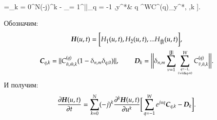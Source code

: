 \begin{urv}{60}
	 =\sum_{k = 0}^{N}(-j)^k\bigg[
	\sum_{q = -1}^{W} e^{juq} \sum_{\nu = 1, \atop \tilde{\nu}\neq y^*\& q\neq 0}^{|\mathbb{J}|} 
	 C^{(q)}_{\tilde{\nu}, y^*,k}\pdv[k]{H_{\tilde{\nu}}(u,t)}{u}
	-
	\sum_{\nu = 1}^{||}\sum_{q = -1 ,\atop \tilde{\nu}\neq y^*\& q }^{W}C^{(q)}_{y^*, \tilde{\nu},k}
	\bigg].\\
\end{urv}	
Обозначим:
\begin{gather*}
	\boldsymbol{H}(u,t) = \bigg[H_{\tilde{1}}(u,t), H_{\tilde{2}}(u,t), ... H_{\tilde{|\mathbb{J}|} }(u,t)\bigg] ,\\
	\boldsymbol{C}_{q,k} = ||C^{(q)}_{\tilde{n},\tilde{m}, k}(1-\delta_{n,m}\delta_{q,0})||,
	\text{ }\text{ }\text{ }\text{ }\text{ }\text{ }\text{ }\text{ }\text{ }\boldsymbol{D}_k = \bigg|\bigg|\delta_{n,m}
    \sum_{\nu = 1}^{|\mathbb{J}|}\sum_{q = -1 ,\atop \tilde{\nu}\neq \tilde{n}\& q\neq 0 }^{W}C^{(q)}_{\tilde{\nu},\tilde{n},k} \bigg|\bigg|.
\end{gather*}
И получим:
\begin{equation} \label{pervoe_uravnenie}
	\pdv{\boldsymbol{H}(u,t)}{t} =\sum_{k = 0}^{N}(-j)^k\pdv[k]{\boldsymbol{H}(u,t)}{u}\bigg[
	\sum_{q = -1}^{W} e^{juq}\boldsymbol{C}_{q,k}-\boldsymbol{D}_k\bigg].
\end{equation}

